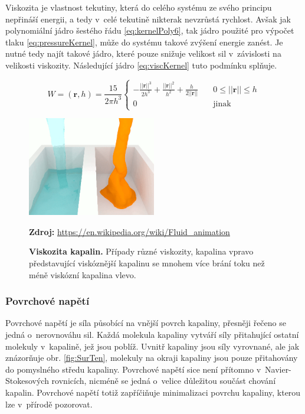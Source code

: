 Viskozita je vlastnost tekutiny, která do celého systému ze svého principu nepřináší energii, a tedy v~celé tekutině nikterak nevzrůstá rychlost. Avšak jak polynomiální jádro šestého řádu \ref{eq:kernelPoly6}, tak jádro použité pro výpočet tlaku \ref{eq:pressureKernel}, může do systému takové zvýšení energie zanést. Je nutné tedy najít takové jádro, které pouze snižuje velikost sil v~závislosti na velikosti viskozity. Následující jádro \ref{eq:viscKernel} tuto podmínku splňuje. \cite{Muller03}

\begin{equation}
	W = (\mathbf{r}, h) = \frac{15}{2 \pi h^3}
	\begin{cases}
		-\frac{||\mathbf{r}||^3}{2h^3} + \frac{||\mathbf{r}||^2}{h^2} + \frac{h}{2||\mathbf{r}||} & \quad 0 \leq ||\mathbf{r}|| \leq h \\
		0                                                                                         & \quad \text{jinak}
	\end{cases}
	\label{eq:viscKernel}
\end{equation}

\begin{figure}[hbt]
	\centering
	\captionsetup{justification=centering}
	\includegraphics[width=0.5\textwidth]{obrazky-figures/viskozita.PNG}
	\caption{\textbf{Viskozita kapalin.} Případy různé viskozity, kapalina vpravo představující viskóznější kapalinu se mnohem více brání toku než méně viskózní kapalina vlevo.}
	\textbf{Zdroj: } \url{https://en.wikipedia.org/wiki/Fluid_animation}
	\label{fig:Vics}
\end{figure}

\subsubsection{Povrchové napětí}
Povrchové napětí je síla působící na vnější povrch kapaliny, přesněji řečeno se jedná o~nerovnováhu sil. Každá molekula kapaliny vytváří síly přitahující ostatní molekuly v~kapalině, jež jsou poblíž. Uvnitř kapaliny jsou síly vyrovnané, ale jak znázorňuje obr. \ref{fig:SurTen}, molekuly na okraji kapaliny jsou pouze přitahovány do pomyslného středu kapaliny. Povrchové napětí sice není přítomno v~Navier-Stokesových rovnicích, nicméně se jedná o~velice důležitou součást chování kapalin. Povrchové napětí totiž zapříčiňuje minimalizaci povrchu kapaliny, kterou lze v~přírodě pozorovat. \cite{KelagerSPH}

